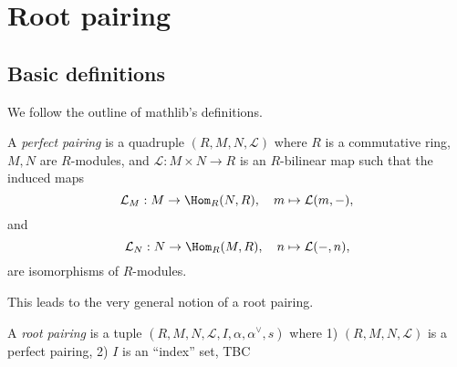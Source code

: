 \chapter{Root pairing}
\label{cha:root-pairing}
\section{Basic definitions}
\label{sec:basic-definitions}

We follow the outline of mathlib's definitions. 

\begin{definition}
    A {\it perfect pairing} is a quadruple $(R,M,N,\mathcal{L})$ where $R$ is a commutative ring, $M,N$ are 
    $R$-modules, and $\mathcal{L} : M \times N \to R$ is an $R$-bilinear map such that the induced maps
    \[
        \mathcal{L}_M : M \to \Hom_R(N,R), \quad m \mapsto \mathcal{L}(m,-),
    \]
    and 
    \[
        \mathcal{L}_N : N \to \Hom_R(M,R), \quad n \mapsto \mathcal{L}(-,n),
    \]
    are isomorphisms of $R$-modules.
\end{definition}

This leads to the very general notion of a root pairing.
\begin{definition}
    A {\it root pairing} is a tuple $(R,M,N,\mathcal{L},I,\alpha, \alpha^\vee,s)$ where
        1) $(R,M,N,\mathcal{L})$ is a perfect pairing,
        2) $I$ is an ``index'' set,
        TBC
\end{definition}